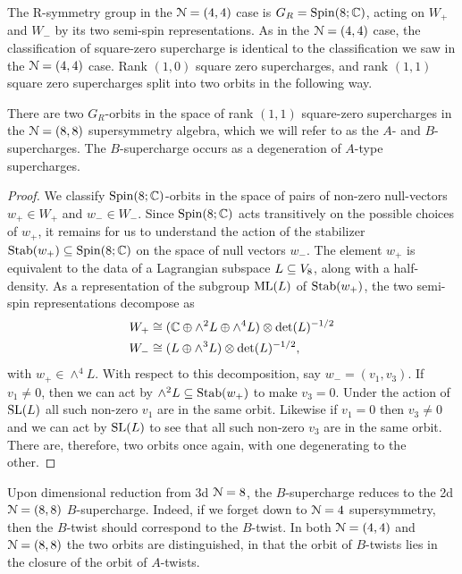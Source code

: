 \documentclass[10pt, oneside]{article}
\begin{document}
The R-symmetry group in the $\mathcal{N}=(4,4)$ case is $G_R = \mathrm{Spin}(8;\mathbb C)$, acting on $W_+$ and $W_-$ by its two semi-spin representations.  As in the $\mathcal{N}=(4,4)$ case, the classification of square-zero supercharge is identical to the classification we saw in the $\mathcal{N}=(4,4)$ case.  Rank $(1,0)$ square zero supercharges, and rank $(1,1)$ square zero supercharges split into two orbits in the following way.

\begin{prop}
There are two $G_R$-orbits in the space of rank $(1,1)$ square-zero supercharges in the $\mathcal{N}=(8,8)$ supersymmetry algebra, which we will refer to as the $A$- and $B$-supercharges.  The $B$-supercharge occurs as a degeneration of $A$-type supercharges.
\end{prop}

\begin{proof}
We classify $\mathrm{Spin}(8;\mathbb C)$-orbits in the space of pairs of non-zero null-vectors $w_+ \in W_+$ and $w_- \in W_-$.  Since $\mathrm{Spin}(8;\mathbb C)$ acts transitively on the possible choices of $w_+$, it remains for us to understand the action of the stabilizer $\operatorname{Stab}(w_+) \subseteq \mathrm{Spin}(8;\mathbb C)$ on the space of null vectors $w_-$.  The element $w_+$ is equivalent to the data of a Lagrangian subspace $L \subseteq V_8$, along with a half-density.  As a representation of the subgroup $\mathrm{ML}(L)$ of $\operatorname{Stab}(w_+)$, the two semi-spin representations decompose as
\begin{align*}
 W_+ &\cong (\mathbb C \oplus \wedge^2 L \oplus \wedge^4 L) \otimes \det(L)^{-1/2} \\
 W_- &\cong (L \oplus \wedge^3 L) \otimes \det(L)^{-1/2},
\end{align*}
with $w_+ \in \wedge^4 L$.  With respect to this decomposition, say $w_- = (v_1,v_3)$.  If $v_1 \ne 0$, then we can act by $\wedge^2 L \subseteq \operatorname{Stab}(w_+)$ to make $v_3 = 0$.  Under the action of $\mathrm{SL}(L)$ all such non-zero $v_1$ are in the same orbit.  Likewise if $v_1 = 0$ then $v_3 \ne 0$ and we can act by $\mathrm{SL}(L)$ to see that all such non-zero $v_3$ are in the same orbit.  There are, therefore, two orbits once again, with one degenerating to the other.
\end{proof}

Upon dimensional reduction from 3d $\mathcal{N}=8$, the $B$-supercharge reduces to the 2d $\mathcal{N}=(8,8)$ $B$-supercharge. 
Indeed, if we forget down to $\mathcal{N}=4$ supersymmetry, then the $B$-twist should correspond to the $B$-twist.  In both $\mathcal{N}=(4,4)$ and $\mathcal{N}=(8,8)$ the two orbits are distinguished, in that the orbit of $B$-twists lies in the closure of the orbit of $A$-twists.
\end{document}
